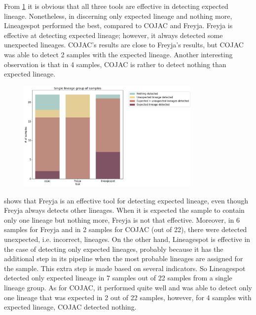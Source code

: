                 From \cref{fig:results:mock:bar-singlin} it is obvious that all three tools are effective in detecting expected lineage. Nonetheless, in discerning only expected lineage and nothing more, Lineagespot performed the best, compared to COJAC and Freyja. Freyja is effective at detecting expected lineage; however, it always detected some unexpected lineages. COJAC's results are close to Freyja's results, but COJAC was able to detect 2 samples with the expected lineage. Another interesting observation is that in 4 samples, COJAC is rather to detect nothing than expected lineage. 
                \begin{figure}[ht!]
                	\centering
                    \includegraphics[width=0.8\textwidth]{figures/results/mock/singlin-num-bars.png}
                    \label{fig:results:mock:bar-singlin}
                \end{figure}
                 shows that Freyja is an effective tool for detecting expected lineage, even though Freyja always detects other lineages. When it is expected the sample to contain only one lineage but nothing more, Freyja is not that effective. Moreover, in 6 samples for Freyja and in 2 samples for COJAC (out of 22), there were detected unexpected, i.e. incorrect, lineages. On the other hand, Lineagespot is effective in the case of detecting only expected lineages, probably because it has the additional step in its pipeline when the most probable lineages are assigned for the sample. This extra step is made based on several indicators. So Lineagespot detected only expected lineage in 7 samples out of 22 samples from a single lineage group. As for COJAC, it performed quite well and was able to detect only one lineage that was expected in 2 out of 22 samples, however, for 4 samples with expected lineage, COJAC detected nothing.
                
